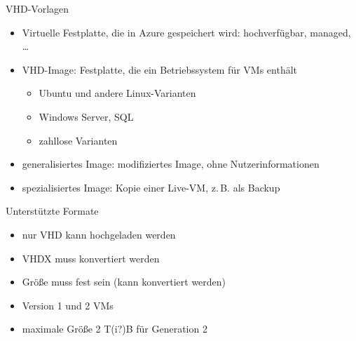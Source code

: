 

\begin{flashcard}[Definition]{VHD-Vorlagen}
    \begin{itemize}
        \item Virtuelle Festplatte, die in Azure gespeichert wird: hochverfügbar, managed, \ldots
        \item VHD-Image: Festplatte, die ein Betriebssystem für VMs enthält
            \begin{itemize}
                \item Ubuntu und andere Linux-Varianten
                \item Windows Server, SQL
                \item zahllose Varianten
            \end{itemize}
        \item generalisiertes Image:\newline
            modifiziertes Image, ohne Nutzerinformationen
        \item spezialisiertes Image:\newline
            Kopie einer Live-VM, z.\,B. als Backup
    \end{itemize}
\end{flashcard}

\begin{flashcard}[Definition]{Unterstützte Formate}
    \begin{itemize}
        \item[!] nur VHD kann hochgeladen werden
        \item VHDX muss konvertiert werden
        \item Größe muss fest sein (kann konvertiert werden)
        \item Version 1 und 2 VMs
        \item maximale Größe 2 T(i?)B für Generation 2
    \end{itemize}
\end{flashcard}

